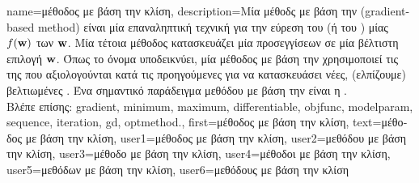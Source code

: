 {name={\foreignlanguage{greek}{μέθοδος με βάση την κλίση}}, 
	description={\foreignlanguage{greek}{Μία μέθοδς με βάση την} 
		 (gradient-based method) \foreignlanguage{greek}{είναι μία επαναληπτική τεχνική για την εύρεση του} 
		 (\foreignlanguage{greek}{ή του} ) \foreignlanguage{greek}{μίας} 
		  $f({\bf w})$ \foreignlanguage{greek}{των}  ${\bf w}$. 
		\foreignlanguage{greek}{Μία τέτοια μέθοδος κατασκευάζει μία}  \foreignlanguage{greek}{προσεγγίσεων 
		σε μία βέλτιστη επιλογή} ${\bf w}$. \foreignlanguage{greek}{Όπως το όνομα υποδεικνύει,} \foreignlanguage{greek}{μία μέθοδος με 
		βάση την}  \foreignlanguage{greek}{χρησιμοποιεί τις}  \foreignlanguage{greek}{της} 
		 \foreignlanguage{greek}{που αξιολογούνται κατά τις προηγούμενες}  
		\foreignlanguage{greek}{για να κατασκευάσει νέες, (ελπίζουμε) βελτιωμένες} . 
		\foreignlanguage{greek}{Ένα σημαντικό παράδειγμα μεθόδου με βάση την}  
		\foreignlanguage{greek}{είναι η} .
		\\
		\foreignlanguage{greek}{Βλέπε επίσης:} \gls{gradient}, \gls{minimum}, \gls{maximum}, \gls{differentiable}, \gls{objfunc}, \gls{modelparam}, 
		\gls{sequence}, \gls{iteration}, \gls{gd}, \gls{optmethod}.},
	first={\foreignlanguage{greek}{μέθοδος με βάση την κλίση}},
	text={\foreignlanguage{greek}{μέθοδος με βάση την κλίση}},
	user1={\foreignlanguage{greek}{μέθοδος με βάση την κλίση}}, %
	user2={\foreignlanguage{greek}{μεθόδου με βάση την κλίση}}, %
	user3={\foreignlanguage{greek}{μέθοδο με βάση την κλίση}}, %
	user4={\foreignlanguage{greek}{μέθοδοι με βάση την κλίση}}, %
	user5={\foreignlanguage{greek}{μεθόδων με βάση την κλίση}}, %
	user6={\foreignlanguage{greek}{μεθόδους με βάση την κλίση}} %
}

